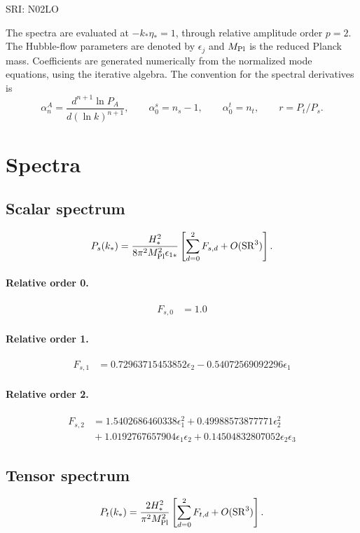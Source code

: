 \documentclass[10pt]{article}
\begin{document}
\begin{center}\Large SRI: N02LO\end{center}
The spectra are evaluated at $-k_*\eta_*=1$, through relative amplitude
order $p=2$. The Hubble-flow parameters are denoted by $\epsilon_j$
and $M_{\rm Pl}$ is the reduced Planck mass. Coefficients are generated
numerically from the normalized mode equations, using the iterative algebra.
The convention for the spectral derivatives is
\[
\alpha_n^A=\frac{d^{n+1}\ln P_A}{d(\ln k)^{n+1}},\qquad
\alpha_0^s=n_s-1,\qquad\alpha_0^t=n_t,\qquad r=P_t/P_s.
\]
\section{Spectra}

\subsection{Scalar spectrum}
\[P_s(k_*)=\frac{H_*^2}{8\pi^2M_{\rm Pl}^2\epsilon_{1*}}\left[\sum_{d=0}^{2}F_{s,d}+O(\mathrm{SR}^{3})\right].\]
\paragraph{Relative order 0.}
\begin{align*}
F_{s,0} &= 1.0
\end{align*}

\paragraph{Relative order 1.}
\begin{align*}
F_{s,1} &= 0.72963715453852 \epsilon_{2} - 0.54072569092296 \epsilon_{1}
\end{align*}

\paragraph{Relative order 2.}
\begin{align*}
F_{s,2} &= 1.5402686460338 \epsilon_{1}^{2} + 0.49988573877771 \epsilon_{2}^{2} \\
&{}  + 1.0192767657904 \epsilon_{1} \epsilon_{2} + 0.14504832807052 \epsilon_{2} \epsilon_{3}
\end{align*}

\subsection{Tensor spectrum}
\[P_t(k_*)=\frac{2H_*^2}{\pi^2M_{\rm Pl}^2}\left[\sum_{d=0}^{2}F_{t,d}+O(\mathrm{SR}^{3})\right].\]
\end{document}
